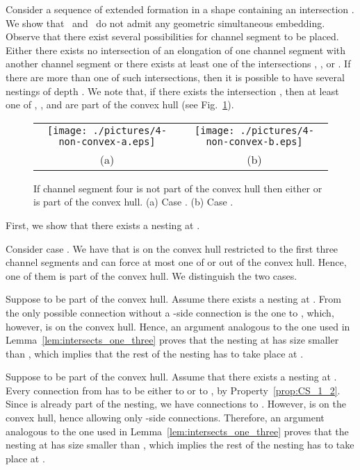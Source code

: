 \documentclass[a4paper,10pt]{llncs}
\newcounter{prop}
\renewenvironment{proof}
{{\bf Proof:}}{\hspace*{\fill}\par\vspace{2mm}}
\newcommand{\T}{\mbox{ }}
\renewcommand{\P}{\mbox{ }}
\begin{document}
\begin{proof}
Consider a sequence of extended formation in a shape containing an intersection . We show that \T and \P do not admit any geometric simultaneous embedding. Observe that there exist several possibilities for channel segment  to be placed. Either there exists no intersection of an elongation of one channel segment with another channel segment or there exists at least one of the intersections , ,  or .
If there are more than one of such intersections, then it is possible to have several nestings of depth .
We note that, if there exists the intersection , then at least one of , , and  are part of the convex hull (see Fig.~\ref{fig:non-convex}).

\begin{figure}[ht]
\begin{center}
\begin{tabular}{c c}
\mbox{\texttt{[image: ./pictures/4-non-convex-a.eps]}} \hspace{0.1cm} &
\mbox{\texttt{[image: ./pictures/4-non-convex-b.eps]}} \\
(a) & (b)\\
\end{tabular}
\caption{If channel segment four is not part of the convex hull then either  or  is part of the convex hull. (a) Case . (b) Case .}
\label{fig:non-convex}
\end{center}
\end{figure}

First, we show that there exists a nesting at .

Consider case . We have that  is on the convex hull restricted to the first three channel segments and  can force at most one of  or  out of the convex hull. Hence, one of them is part of the convex hull. We distinguish the two cases.

Suppose  to be part of the convex hull. Assume there exists a nesting at . From  the only possible connection without a -side connection is the one to , which, however, is on the convex hull. Hence, an argument analogous to the one used in Lemma~\ref{lem:intersects_one_three} proves that the nesting at  has size smaller than , which implies that the rest of the nesting has to take place at .

Suppose  to be part of the convex hull. Assume that there exists a nesting at . Every connection from  has to be either to  or to , by Property~\ref{prop:CS_1_2}. Since  is already part of the nesting, we have connections to . However,  is on the convex hull, hence allowing only -side connections. Therefore, an argument analogous to the one used in Lemma~\ref{lem:intersects_one_three} proves that the nesting at  has size smaller than , which implies the rest of the nesting has to take place at .


\end{proof}
\end{document}
